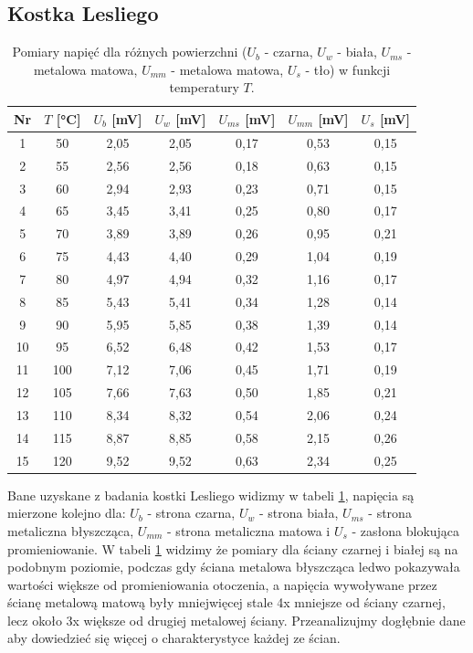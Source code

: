 \documentclass[12pt]{article}
\begin{document}
\subsection{Kostka Lesliego}
\begin{table}[H]
    \centering
    \begin{tabular}{c|c|cccc|c}
        \toprule
        Nr & $T$ [°C] & $U_b$ [mV] & $U_w$ [mV] & $U_{ms}$ [mV] & $U_{mm}$ [mV] & $U_s$ [mV] \\
        \midrule
        1  & 50  & 2{,}05 & 2{,}05 & 0{,}17 & 0{,}53 & 0{,}15 \\
        2  & 55  & 2{,}56 & 2{,}56 & 0{,}18 & 0{,}63 & 0{,}15 \\
        3  & 60  & 2{,}94 & 2{,}93 & 0{,}23 & 0{,}71 & 0{,}15 \\
        4  & 65  & 3{,}45 & 3{,}41 & 0{,}25 & 0{,}80 & 0{,}17 \\
        5  & 70  & 3{,}89 & 3{,}89 & 0{,}26 & 0{,}95 & 0{,}21 \\
        6  & 75  & 4{,}43 & 4{,}40 & 0{,}29 & 1{,}04 & 0{,}19 \\
        7  & 80  & 4{,}97 & 4{,}94 & 0{,}32 & 1{,}16 & 0{,}17 \\
        8  & 85  & 5{,}43 & 5{,}41 & 0{,}34 & 1{,}28 & 0{,}14 \\
        9  & 90  & 5{,}95 & 5{,}85 & 0{,}38 & 1{,}39 & 0{,}14 \\
        10 & 95  & 6{,}52 & 6{,}48 & 0{,}42 & 1{,}53 & 0{,}17 \\
        11 & 100 & 7{,}12 & 7{,}06 & 0{,}45 & 1{,}71 & 0{,}19 \\
        12 & 105 & 7{,}66 & 7{,}63 & 0{,}50 & 1{,}85 & 0{,}21 \\
        13 & 110 & 8{,}34 & 8{,}32 & 0{,}54 & 2{,}06 & 0{,}24 \\
        14 & 115 & 8{,}87 & 8{,}85 & 0{,}58 & 2{,}15 & 0{,}26 \\
        15 & 120 & 9{,}52 & 9{,}52 & 0{,}63 & 2{,}34 & 0{,}25 \\
        \bottomrule
    \end{tabular}
    \caption{Pomiary napięć dla różnych powierzchni ($U_b$ - czarna, $U_w$ - biała, $U_{ms}$ - metalowa matowa, $U_{mm}$ - metalowa matowa, $U_s$ - tło) w funkcji temperatury $T$.}
    \label{tab:cube_measurements}
\end{table}
Bane uzyskane z badania kostki Lesliego widizmy w tabeli \ref{tab:cube_measurements}, napięcia są mierzone kolejno dla: $U_b$ - strona czarna, $U_w$ - strona biała, $U_{ms}$ - strona metaliczna błyszcząca, $U_{mm}$ - strona metaliczna matowa i $U_s$ - zasłona blokująca promieniowanie.
W tabeli \ref{tab:cube_measurements} widzimy że pomiary dla ściany czarnej i białej są na podobnym poziomie, podczas gdy ściana metalowa błyszcząca ledwo pokazywała wartości większe od promieniowania otoczenia, 
a napięcia wywoływane przez ścianę metalową matową były mniejwięcej stale 4x mniejsze od ściany czarnej, lecz około 3x większe od drugiej metalowej ściany.
Przeanalizujmy dogłębnie dane aby dowiedzieć się więcej o charakterystyce każdej ze ścian.
\end{document}
